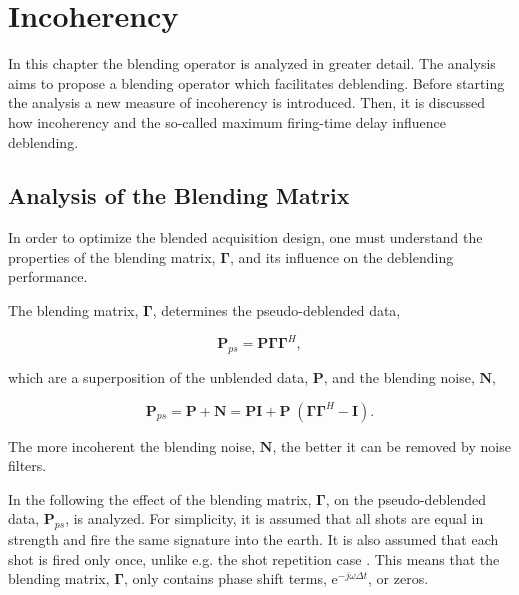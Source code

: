 \chapter{Incoherency} \label{chap:Incoherency}

In this chapter the blending operator is analyzed in greater detail. The analysis aims to propose a blending operator which facilitates deblending. Before starting the analysis a new measure of incoherency is introduced. Then, it is discussed how incoherency and the so-called maximum firing-time delay influence deblending.

\section{Analysis of the Blending Matrix} \label{sec:BlendingMatrix}

In order to optimize the blended acquisition design, one must understand the properties of the blending matrix, $\mathbf{\Gamma}$, and its influence on the deblending performance.

The blending matrix, $\mathbf{\Gamma}$, determines the pseudo-deblended data,

\begin{equation}
	\mathbf{P}_{ps} = \mathbf{P \Gamma \Gamma}^H,
	\label{eq:Ch-Theory-Pseudo-Deblended-Data}
\end{equation}

which are a superposition of the unblended data, $\mathbf{P}$, and the blending noise, $\mathbf{N}$,

\begin{equation}
	\mathbf{P}_{ps} = \mathbf{P} + \mathbf{N} = \mathbf{P I} + \mathbf{P} \; (\mathbf{\Gamma \Gamma}^H - \mathbf{I}).
	\label{eq:Ch-Theory-PseudoSuperposition}
\end{equation}

The more incoherent the blending noise, $\mathbf{N}$, the better it can be removed by noise filters.

In the following the effect of the blending matrix, $\mathbf{\Gamma}$, on the pseudo-deblended data, $\mathbf{P}_{ps}$, is analyzed. For simplicity, it is assumed that all shots are equal in strength and fire the same signature into the earth. It is also assumed that each shot is fired only once, unlike e.g. the shot repetition case \citep{Sixue}. This means that the blending matrix, $\mathbf{\Gamma}$, only contains phase shift terms, $\mathrm{e}^{-j \omega \Delta t}$, or zeros. 

